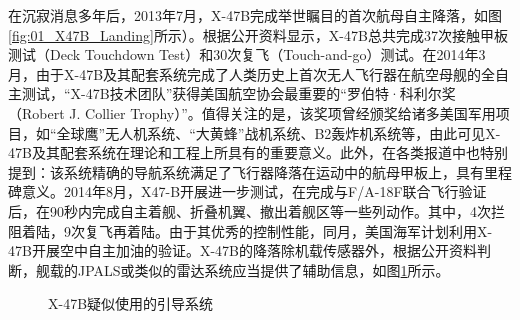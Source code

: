 在沉寂消息多年后，2013年7月，X-47B完成举世瞩目的首次航母自主降落，如图\ref{fig:01_X47B_Landing}所示）。根据公开资料显示\cite{X_47B}，X-47B总共完成37次接触甲板测试（Deck Touchdown Test）和30次复飞（Touch-and-go）测试。在2014年3月，由于X-47B及其配套系统完成了人类历史上首次无人飞行器在航空母舰的全自主测试，“X-47B技术团队”获得美国航空协会最重要的“罗伯特·科利尔奖（Robert J. Collier Trophy）”\cite{X_47B_Award}。值得关注的是，该奖项曾经颁奖给诸多美国军用项目，如“全球鹰”无人机系统、“大黄蜂”战机系统、B2轰炸机系统等，由此可见X-47B及其配套系统在理论和工程上所具有的重要意义。此外，在各类报道中也特别提到：该系统精确的导航系统满足了飞行器降落在运动中的航母甲板上，具有里程碑意义\cite{X_47B_Report}。2014年8月，X47-B开展进一步测试，在完成与F/A-18F联合飞行验证后，在90秒内完成自主着舰、折叠机翼、撤出着舰区等一些列动作。其中，4次拦阻着陆，9次复飞再着陆。由于其优秀的控制性能，同月，美国海军计划利用X-47B开展空中自主加油的验证。X-47B的降落除机载传感器外，根据公开资料判断，舰载的JPALS或类似的雷达系统应当提供了辅助信息，如图\ref{fig:X47B_LandingOptical}所示。

\begin{figure}[htb]
	\centering%
	\hspace{1em}%
	\caption{X-47B疑似使用的引导系统}
	\label{fig:X47B_LandingOptical}
\end{figure}



